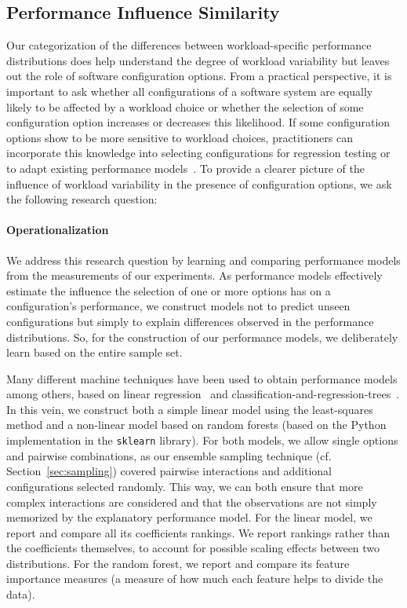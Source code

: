

\subsection{Performance Influence Similarity}\label{sec:rq2}
Our categorization of the differences between workload-specific performance distributions does help understand the degree of workload variability but leaves out the role of software configuration options. From a practical perspective, it is important to ask whether all configurations of a software system are equally likely to be affected by a workload choice or whether the selection of some configuration option increases or decreases this likelihood. If some configuration options show to be more sensitive to workload choices, practitioners can incorporate this knowledge into selecting configurations for regression testing or to adapt existing performance models~\cite{jamshidi_learning_2018}. To provide a clearer picture of the influence of workload variability in the presence of configuration options, we ask the following research question:


\paragraph*{Operationalization}
We address this research question by learning and comparing performance models from the measurements of our experiments. As performance models effectively estimate the influence the selection of one or more options has on a configuration’s performance, we construct models not to predict unseen configurations but simply to explain differences observed in the performance distributions. So, for the construction of our performance models, we deliberately learn based on the entire sample set.

Many different machine techniques have been used to obtain performance models among others, based on linear regression~\cite{perLasso,siegmundPerformanceinfluenceModelsHighly2015} and classification-and-regression-trees~\cite{sarkarCostEfficientSamplingPerformance,guo_2018_data}. In this vein, we construct both a simple linear model using the least-squares method and a non-linear model based on random forests (based on the Python implementation in the \texttt{sklearn} library). For both models, we allow single options and pairwise combinations, as our ensemble sampling technique (cf. Section~\ref{sec:sampling}) covered pairwise interactions and additional configurations selected randomly. This way, we can both ensure that more complex interactions are considered and that the observations are not simply memorized by the explanatory performance model. For the linear model, we report and compare all its coefficients rankings. We report rankings rather than the coefficients themselves, to account for possible scaling effects between two distributions. For the random forest, we report and compare its feature importance measures (a measure of how much each feature helps to divide the data). 

